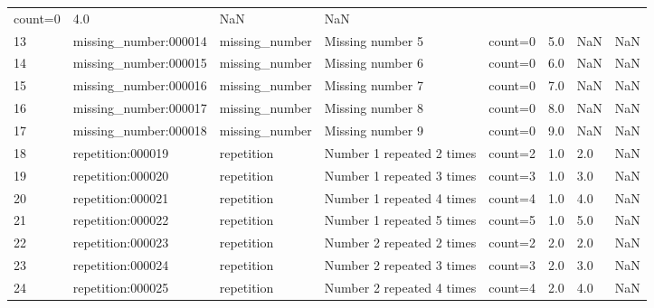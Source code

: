 \documentclass[
  11pt,
  a4paper,
  oneside,
  openany]{article}
\begin{document}
\begin{longtable}[]{@{}llllllll@{}}
count=0 & 4.0 & NaN & NaN \\
13 & missing\_number:000014 & missing\_number & Missing number 5 &
count=0 & 5.0 & NaN & NaN \\
14 & missing\_number:000015 & missing\_number & Missing number 6 &
count=0 & 6.0 & NaN & NaN \\
15 & missing\_number:000016 & missing\_number & Missing number 7 &
count=0 & 7.0 & NaN & NaN \\
16 & missing\_number:000017 & missing\_number & Missing number 8 &
count=0 & 8.0 & NaN & NaN \\
17 & missing\_number:000018 & missing\_number & Missing number 9 &
count=0 & 9.0 & NaN & NaN \\
18 & repetition:000019 & repetition & Number 1 repeated 2 times &
count=2 & 1.0 & 2.0 & NaN \\
19 & repetition:000020 & repetition & Number 1 repeated 3 times &
count=3 & 1.0 & 3.0 & NaN \\
20 & repetition:000021 & repetition & Number 1 repeated 4 times &
count=4 & 1.0 & 4.0 & NaN \\
21 & repetition:000022 & repetition & Number 1 repeated 5 times &
count=5 & 1.0 & 5.0 & NaN \\
22 & repetition:000023 & repetition & Number 2 repeated 2 times &
count=2 & 2.0 & 2.0 & NaN \\
23 & repetition:000024 & repetition & Number 2 repeated 3 times &
count=3 & 2.0 & 3.0 & NaN \\
24 & repetition:000025 & repetition & Number 2 repeated 4 times &
count=4 & 2.0 & 4.0 & NaN \\
\end{longtable}
\end{document}

